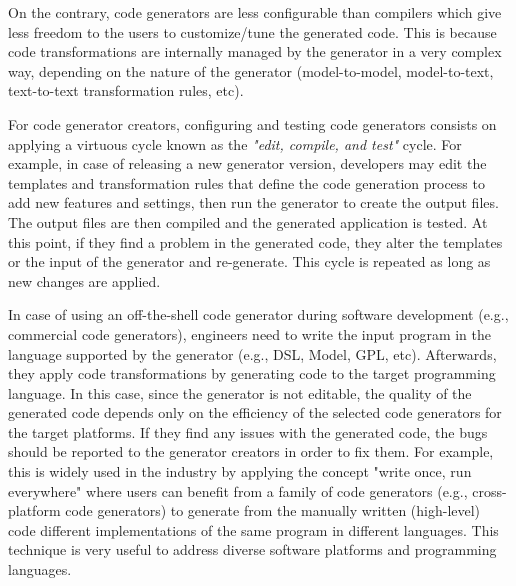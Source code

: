 On the contrary, code generators are less configurable than compilers which give less freedom to the users to customize/tune the generated code. This is because code transformations are internally managed by the generator in a very complex way, depending on the nature of the generator (model-to-model, model-to-text, text-to-text transformation rules, etc).

For code generator creators, configuring and testing code generators consists on applying a virtuous cycle known as the \textit{"edit, compile, and test"} cycle. 
For example, in case of releasing a new generator version, developers may edit the templates and transformation rules that define the code generation process to add new features and settings, then run the generator to create the output files. The output files are then compiled and the generated application is tested. At this point, if they find a problem in the generated code, they alter the templates or the input of the generator and re-generate. This cycle is repeated as long as new changes are applied. 

In case of using an off-the-shell code generator during software development (e.g., commercial code generators), engineers need to write the input program in the language supported by the generator (e.g., DSL, Model, GPL, etc). Afterwards, they apply code transformations by generating code to the target programming language. In this case, since the generator is not editable, the quality of the generated code depends only on the efficiency of the selected code generators for the target platforms. If they find any issues with the generated code, the bugs should be reported to the generator creators in order to fix them.
For example, this is widely used in the industry by applying the concept "write once, run everywhere" where users can benefit from a family of code generators (e.g., cross-platform code generators\cite{fumero2015runtime}) to generate from the manually written (high-level) code different implementations of the same program in different languages. This technique is very useful to address diverse software platforms and programming languages.
 

